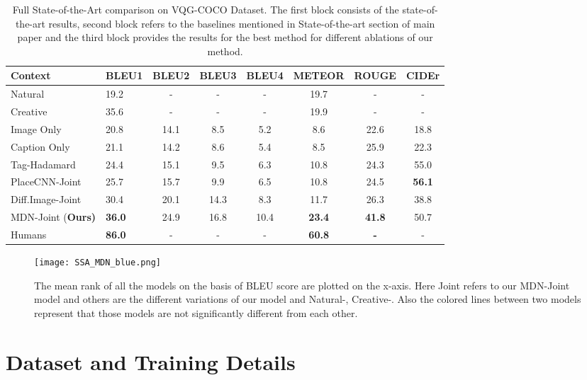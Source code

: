 \documentclass[11pt,a4paper]{article}
\begin{document}
\begin{table*}[ht]
\centering
\begin{tabular}{|l|lcccccc|}
\hline \bf Context &  \bf BLEU1 & \bf BLEU2  & \bf BLEU3  & \bf BLEU4& \bf METEOR & \bf ROUGE & \bf CIDEr \\ \hline 

Natural \citeyear{mostafazadeh2016generating} & 19.2  & -&- & -  & 19.7  &- & -  \\
Creative \citeyear{jain2017creativity} & {35.6}  & -& -& -&   19.9 & - & - \\ \hline
Image Only &  20.8  & 14.1&8.5 &5.2 &     8.6  & 22.6 & 18.8\\
Caption Only & 21.1  & 14.2& 8.6&5.4 &   8.5  & 25.9 & 22.3\\\hline
Tag-Hadamard & {24.4}  &15.1 & 9.5& 6.3&{10.8}& {24.3} & {55.0}\\ 
PlaceCNN-Joint & {25.7}  & 15.7& 9.9& 6.5  &{10.8}&{24.5} &\textbf{56.1} \\
Diff.Image-Joint& 30.4  & 20.1& 14.3& 8.3 & {11.7} & 26.3 & {38.8}\\
MDN-Joint (\bf Ours)& \textbf{36.0}  & 24.9&16.8 & 10.4&\textbf{23.4}&\textbf{41.8}& 50.7\\\hline
Humans \citeyear{mostafazadeh2016generating} & \textbf{86.0} &- &- &- &\textbf{60.8}&\textbf{-}& -\\\hline
\end{tabular}
\caption{\label{score_tab_3a}Full State-of-the-Art comparison on VQG-COCO Dataset. The first block consists of the state-of-the-art results, second block refers to the baselines mentioned in State-of-the-art section of main paper and the third block provides the results for the best method for different ablations of our method. }
\end{table*}


\begin{figure}[ht]
	\centering
	\texttt{[image: SSA\_MDN\_blue.png]}
	\caption{The mean rank of all the models on the basis of BLEU score are plotted on the x-axis. Here Joint refers to our MDN-Joint model and others are the different variations of our model and Natural-\cite{mostafazadeh2016generating}, Creative-\cite{jain2017creativity}. Also the colored lines between two models represent that those models are not significantly different from each other. }
	\label{fig:result_1_A}
\end{figure}
\section{Dataset and Training Details}
\end{document}
